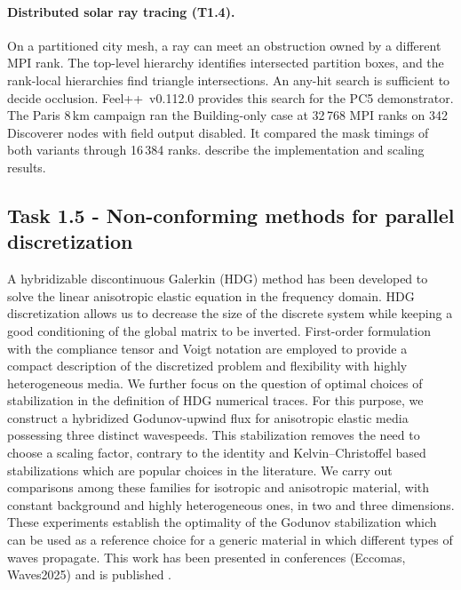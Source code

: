 \paragraph{Distributed solar ray tracing (T1.4).}
On a partitioned city mesh, a ray can meet an obstruction owned by a
different MPI rank. The top-level hierarchy identifies intersected
partition boxes, and the rank-local hierarchies find triangle
intersections. An any-hit search is sufficient to decide occlusion.
Feel++~v0.112.0 provides this search for the PC5
\KtirioUrbanBuildingContext{} demonstrator. The Paris 8\,km campaign
ran the Building-only case at 32\,768 MPI ranks on 342 Discoverer nodes
with field output disabled. It compared the mask timings of both
variants through 16\,384 ranks.
describe the implementation and scaling results.


\subsection{Task 1.5 - Non-conforming methods for parallel discretization}
A hybridizable discontinuous Galerkin (HDG) method has been developed to solve the linear anisotropic elastic equation in the frequency domain. HDG discretization allows us to decrease the size of the discrete system while keeping a good conditioning of the global matrix to be inverted. First-order formulation with the compliance tensor and Voigt notation are employed to provide a compact description of the discretized problem and flexibility with highly heterogeneous media. We further focus on the question of optimal choices of stabilization in the definition of HDG numerical traces. For this purpose, we construct a hybridized Godunov-upwind flux for anisotropic elastic media possessing three distinct wavespeeds. This stabilization removes the need to choose a scaling factor, contrary to the identity and Kelvin–Christoffel based stabilizations which are popular choices in the literature. We carry out comparisons among these families for isotropic and anisotropic material, with constant background and highly heterogeneous ones, in two and three dimensions. These experiments establish the optimality of the Godunov stabilization which can be used as a reference choice for a generic material in which different types of waves propagate. This work has been presented in conferences (Eccomas, Waves2025) and is published \cite{pham_numerical_2024}.

